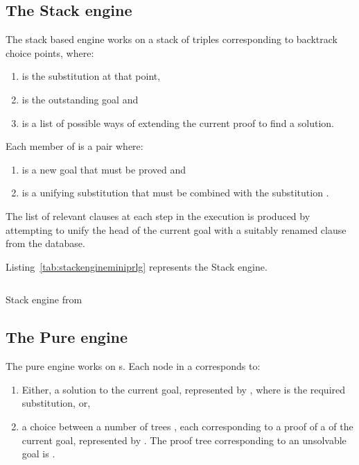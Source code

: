 \documentclass[thesis-solanki.tex]{files}
\begin{document}
\subsection{The Stack engine}
The stack based engine works on a stack of triples 
corresponding to backtrack choice points, where: 
\begin{enumerate}
\item {} is the substitution at that point,

\item {} is the outstanding goal and  

\item {} is a list of possible ways of extending the current proof to find a solution.   
\end{enumerate}
Each member of  is a pair  where: 
\begin{enumerate}
\item {} is a new goal that must be proved and 
\item {} is a unifying substitution that must be combined with the substitution .
\end{enumerate}

The list of relevant clauses at each step in the execution is produced by attempting to unify the head of the
current goal with a suitably renamed clause from the database.

Listing~\ref{tab:stackengineminiprlg} represents the Stack engine.

\begin{code-list}[H]
\begin{singlespace}
\inputminted[linenos, firstline=29, lastline=56]{haskell}{haskell-proto3-sudsy-woe.hs}
\end{singlespace}
\caption{Stack engine from  \cite{website:mini-prolog-hugs98}}
\label{tab:stackengineminiprlg}
\end{code-list}

\subsection{The Pure engine}
The pure engine works on s. Each node in a  corresponds to:
\begin{enumerate}
\item
  Either, a solution to the current goal, represented by , where  is
  the required substitution, or,
\item
  a choice between a number of trees , each corresponding to a proof of a
   of the current goal, represented by .
  The proof tree corresponding to an unsolvable goal is . 
\end{enumerate}
\end{document}
